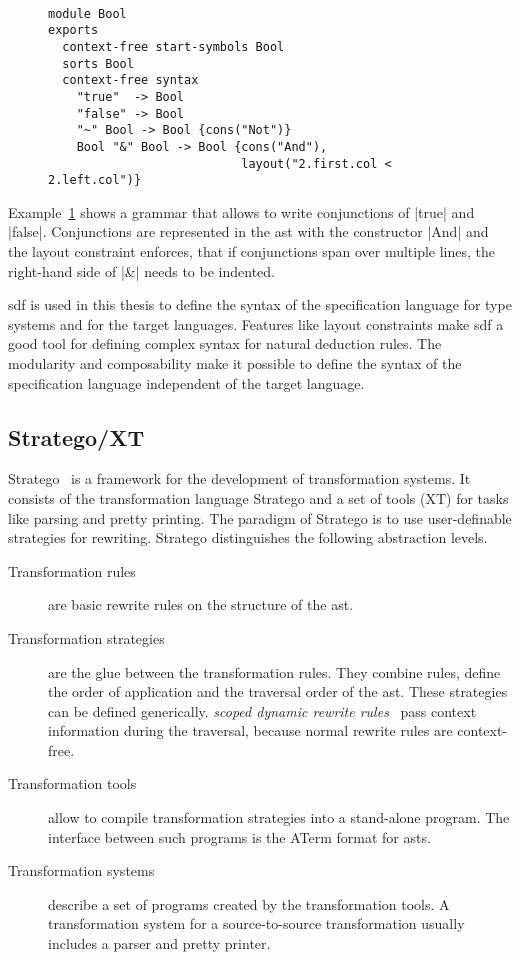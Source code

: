 \begin{figure}
\begin{example}{~}
\begin{lstlisting}[language=sdf]
module Bool
exports
  context-free start-symbols Bool
  sorts Bool
  context-free syntax
    "true"  -> Bool
    "false" -> Bool
    "~" Bool -> Bool {cons("Not")}
    Bool "&" Bool -> Bool {cons("And"),
                           layout("2.first.col < 2.left.col")}
\end{lstlisting}
\label{ex:sdf-grammar}
\end{example}
\end{figure}

Example~\ref{ex:sdf-grammar} shows a grammar that allows to write
conjunctions of \code|true| and \code|false|. Conjunctions are
represented in the \gls{ast} with the constructor \code|And| and the
layout constraint enforces, that if conjunctions span over multiple
lines, the right-hand side of \code|&| needs to be indented.

\gls{sdf} is used in this thesis to define the syntax of the
specification language for type systems and for the target
languages. Features like layout constraints make \gls{sdf} a good tool
for defining complex syntax for natural deduction rules. The
modularity and composability make it possible to define the syntax of
the specification language independent of the target language.

\subsection{Stratego/XT}
Stratego~\cite{Visser01} is a framework for the development of
transformation systems. It consists of the transformation language
Stratego and a set of tools (XT) for tasks like parsing and pretty
printing. The paradigm of Stratego is to use user-definable strategies
for rewriting. Stratego distinguishes the following abstraction
levels.

\begin{description}
\item[Transformation rules] are basic rewrite rules on the structure
  of the \gls{ast}.
\item[Transformation strategies] are the glue between the
  transformation rules. They combine rules, define the order of
  application and the traversal order of the \gls{ast}. These
  strategies can be defined generically. \textit{scoped dynamic
    rewrite rules}~\cite{Visser01scopeddynamic} pass context
  information during the traversal, because normal rewrite rules are
  context-free.
\item[Transformation tools] allow to compile transformation strategies
  into a stand-alone program. The interface between such programs is
  the ATerm format for \glspl{ast}.
\item[Transformation systems] describe a set of programs created by
  the transformation tools. A transformation system for a
  source-to-source transformation usually includes a parser and pretty
  printer.
\end{description}

